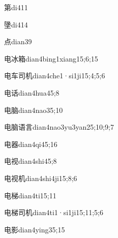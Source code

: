 \begin{verbete}{第}{di4}{11}
\end{verbete}
\begin{verbete}{墬}{di4}{14}
\end{verbete}
\begin{verbete}{点}{dian3}{9}
\end{verbete}
\begin{verbete}{电冰箱}{dian4bing1xiang1}{5;6;15}
\end{verbete}
\begin{verbete}{电车司机}{dian4che1·si1ji1}{5;4;5;6}
\end{verbete}
\begin{verbete}{电话}{dian4hua4}{5;8}
\end{verbete}
\begin{verbete}{电脑}{dian4nao3}{5;10}
\end{verbete}
\begin{verbete}{电脑语言}{dian4nao3yu3yan2}{5;10;9;7}
\end{verbete}
\begin{verbete}{电器}{dian4qi4}{5;16}
\end{verbete}
\begin{verbete}{电视}{dian4shi4}{5;8}
\end{verbete}
\begin{verbete}{电视机}{dian4shi4ji1}{5;8;6}
\end{verbete}
\begin{verbete}{电梯}{dian4ti1}{5;11}
\end{verbete}
\begin{verbete}{电梯司机}{dian4ti1·si1ji1}{5;11;5;6}
\end{verbete}
\begin{verbete}{电影}{dian4ying3}{5;15}
\end{verbete}
